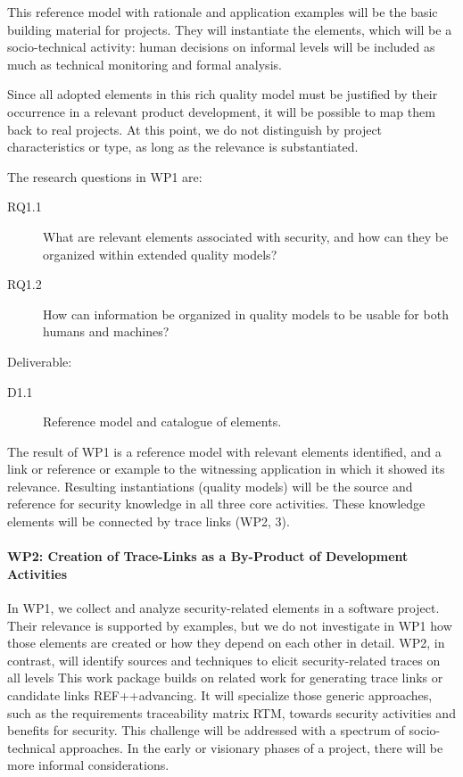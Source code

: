 This reference model with rationale and application examples will be the basic building material for projects. They will instantiate the elements, which will be a socio-technical activity: human decisions on informal levels will be included as much as technical monitoring and formal analysis.

Since all adopted elements in this rich quality model must be justified by their occurrence in a relevant product development, it will be possible to map them back to real projects. At this point, we do not distinguish by project characteristics or type, as long as the relevance is substantiated. 

The research questions in WP1 are:
\begin{description}
	\item[RQ1.1] What are relevant elements associated with security, and how can they be organized within extended quality models?
	\item[RQ1.2] How can information be organized in quality models to be usable for both humans and machines?
\end{description}

Deliverable:  
\begin{description}
\item[D1.1] Reference model and catalogue of elements.
\end{description}

The result of WP1 is a reference model with relevant elements identified, and a link or reference or example to the witnessing application in which it showed its relevance. Resulting instantiations (quality models) will be the source and reference for security knowledge in all three core activities. These knowledge elements will be connected by trace links (WP2, 3).


\paragraph*{WP2: Creation of Trace-Links as a By-Product of Development Activities}
In WP1, we collect and analyze security-related elements in a software project. Their relevance is supported by examples, but we do not investigate in WP1 how those elements are created or how they depend on each other in detail. WP2, in contrast, will identify sources and techniques to elicit security-related traces on all levels This work package builds on related work for generating trace links or candidate links REF++advancing. It will specialize those generic approaches, such as the requirements traceability matrix RTM, towards security activities and benefits for security. This challenge will be addressed with a spectrum of socio-technical approaches. In the early or visionary phases of a project, there will be more informal considerations.

